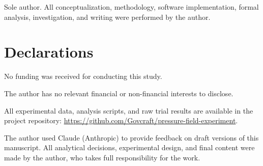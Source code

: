 
Sole author. All conceptualization, methodology, software implementation, formal analysis, investigation, and writing were performed by the author.

\section*{Declarations}


No funding was received for conducting this study.


The author has no relevant financial or non-financial interests to disclose.


All experimental data, analysis scripts, and raw trial results are available in the project repository: \url{https://github.com/Govcraft/pressure-field-experiment}.


The author used Claude (Anthropic) to provide feedback on draft versions of this manuscript. All analytical decisions, experimental design, and final content were made by the author, who takes full responsibility for the work.

\begin{appendices}

\end{appendices}




